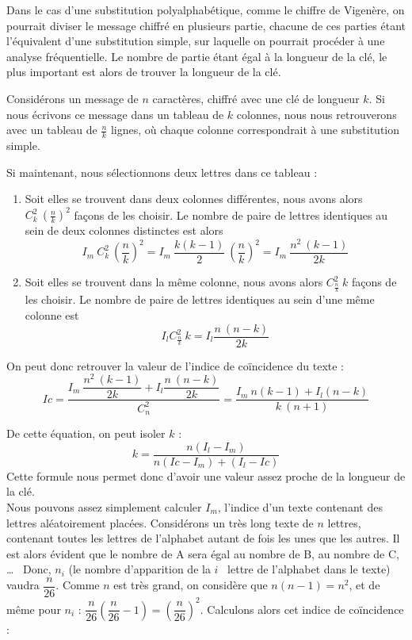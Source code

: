 Dans le cas d'une substitution polyalphabétique, comme le chiffre
de Vigenère, on pourrait diviser le message chiffré en plusieurs
partie, chacune de ces parties étant l'équivalent d'une
substitution simple, sur laquelle on pourrait procéder à une
analyse fréquentielle. Le nombre de partie étant égal à la
longueur de la clé, le plus important est alors de trouver la
longueur de la clé.

Considérons un message de $n$ caractères, chiffré avec une clé de
longueur $k$. Si nous écrivons ce message dans un tableau de $k$
colonnes, nous nous retrouverons avec un tableau de $\frac{n}{k}$
lignes, où chaque colonne correspondrait à une substitution
simple.

Si maintenant, nous sélectionnons deux lettres dans ce tableau :
\begin{enumerate}
  \item Soit elles se trouvent dans deux colonnes différentes, 
nous avons
alors $C_k^2 ~ (\frac{n}{k})^2$ façons de les choisir. Le nombre
de paire de lettres identiques au sein de deux colonnes distinctes
est alors
\[ I_m ~ C_k^2 ~ \left(\dfrac{n}{k}\right)^2 = 
I_m ~ \dfrac{k (k - 1)}{2} ~
\left(\dfrac{n}{k}\right)^2 = I_m ~ \dfrac{n^2 ~ (k-1)}{2k} \]
  \item Soit elles se trouvent dans la même colonne, nous avons
alors $C_{\frac{n}{k}}^2 ~ k $ façons de les choisir. Le nombre de paire de lettres
identiques au sein d'une même colonne est
\[ I_l C_{\frac{n}{k}}^2 ~ k = I_l
\dfrac{n ~ (n-k)}{2k} \]
\end{enumerate}

On peut donc retrouver la valeur de l'indice de coïncidence du
texte :
\[Ic = \dfrac{I_m ~ \dfrac{n^2 ~ (k-1)}{2k} +
I_l \dfrac{n ~ (n-k)}{2k}}{C_n^2} =
\dfrac{I_m ~ n (k-1) + I_l (n-k)}{k ~
(n+1)} \]

De cette équation, on peut isoler $k$ :
\[k = \dfrac{n (I_l - I_m)}{n (Ic - I_m) + (I_l - Ic)} \]
Cette formule nous permet donc d'avoir une valeur assez proche de
la longueur de la clé.
\\

Nous pouvons assez simplement calculer $I_m$, l'indice d'un texte
contenant des lettres aléatoirement placées. Considérons un très
long texte de $n$ lettres, contenant toutes les lettres de
l'alphabet autant de fois les unes que les autres.
 Il est alors évident que le nombre de A
sera égal au nombre de B, au nombre de C, \dots~
Donc, $n_i$ (le nombre d'apparition de la $i$\ieme~ lettre de
l'alphabet dans le texte) vaudra $\dfrac{n}{26}$.
Comme $n$ est très grand, on considère que $n (n-1) = n^2$, et de
même pour $n_i$ : $\dfrac{n}{26} \left(\dfrac{n}{26} - 1\right) =
\left(\dfrac{n}{26}\right)^2$.
Calculons alors cet indice de coïncidence :

